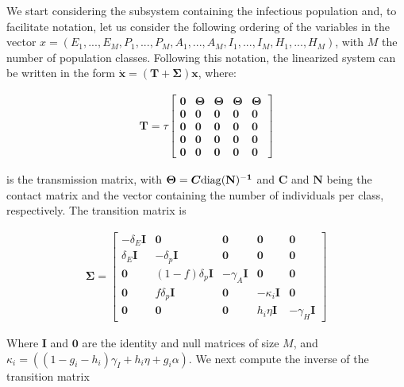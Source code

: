 \documentclass{article}
\newcommand{\bs}[1]{\boldsymbol{#1}}
\begin{document}
We start considering the subsystem containing the infectious population and, to facilitate notation, let us consider the following ordering of the variables in the vector $x = (E_1,...,E_M,P_1,...,P_M,A_1,...,A_M,I_1,...,I_M,H_1,...,H_M)$, with $M$ the number of population classes. Following this notation, the linearized system can be written in the form $\bs{\dot{x}} = (\bs{T} + \bs{\Sigma}) \bs{x}$, where:

\begin{gather}
 \bs{T} = \tau
  \begin{bmatrix}
   \bs{0} & \bs{\Theta} & \bs{\Theta} & \bs{\Theta} & \bs{\Theta} \\
   \bs{0} & \bs{0} & \bs{0} & \bs{0} & \bs{0} \\
   \bs{0} & \bs{0} & \bs{0} & \bs{0} & \bs{0} \\
   \bs{0} & \bs{0} & \bs{0} & \bs{0} & \bs{0} \\
   \bs{0} & \bs{0} & \bs{0} & \bs{0} & \bs{0}
   \end{bmatrix}
\end{gather}

is the transmission matrix, with $\bs{\Theta}=\bs{C}\mathrm{diag}(\bf{N})^{-1}$ and $\bs{C}$ and $\bs{N}$ being the contact matrix and the vector containing the number of individuals per class, respectively. The transition matrix is

\begin{gather}
 \bs{\Sigma} =
  \begin{bmatrix}
   - \delta_E \bs{I} & \bs{0} & \bs{0} & \bs{0} & \bs{0} \\
   \delta_E \bs{I}& -\delta_p \bs{I} & \bs{0} & \bs{0} & \bs{0} \\
   \bs{0} & (1-f) \delta_p \bs{I} & -\gamma_A \bs{I} & \bs{0} & \bs{0} \\
   \bs{0} & f \delta_p \bs{I} & \bs{0} & - \kappa_i \bs{I} & \bs{0} \\
   \bs{0} & \bs{0} & \bs{0} & h_i \eta \bs{I} & -\gamma_H \bs{I}
   \end{bmatrix}
\end{gather}

Where $\bs{I}$ and $\bs{0}$ are the identity and null matrices of size $M$, and $\kappa_i= ((1-g_i-h_i) \gamma_{I} + h_i \eta + g_i \alpha)$. We next compute the inverse of the transition matrix
\end{document}
